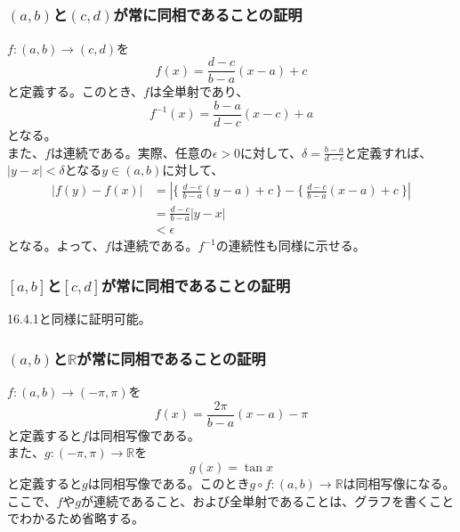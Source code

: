 \documentclass{jsarticle}
\begin{document}
\subsection{}
\subsubsection{$(a,b)$と$(c,d)$が常に同相であることの証明}
$f:(a,b)\to(c,d)$を\[f(x)=\frac{d-c}{b-a}(x-a)+c\]と定義する。このとき、$f$は全単射であり、
\[f^{-1}(x)=\frac{b-a}{d-c}(x-c)+a\]となる。\\
また、$f$は連続である。実際、任意の$\epsilon>0$に対して、$\delta=\frac{b-a}{d-c}$と定義すれば、$|y-x|<\delta$となる$y\in(a,b)$に対して、
\begin{align*}
|f(y)-f(x)|&=|\{\ \frac{d-c}{b-a}(y-a)+c\ \}-\{\ \frac{d-c}{b-a}(x-a)+c\ \}|\\
&=\frac{d-c}{b-a}|y-x|\\
&<\epsilon
\end{align*}
となる。よって、$f$は連続である。$f^{-1}$の連続性も同様に示せる。

\subsubsection{$[a,b]$と$[c,d]$が常に同相であることの証明}
16.4.1と同様に証明可能。

\subsubsection{$(a,b)$と$\mathbb{R}$が常に同相であることの証明}
$f:(a,b)\to(-\pi,\pi)$を
\[f(x)=\frac{2\pi}{b-a}(x-a)-\pi\]
と定義すると$f$は同相写像である。\\
また、$g:(-\pi,\pi)\to\mathbb{R}$を
\[g(x)=\tan x\]
と定義すると$g$は同相写像である。このとき$g\circ f:(a,b)\to\mathbb{R}$は同相写像になる。
ここで、$f$や$g$が連続であること、および全単射であることは、グラフを書くことでわかるため省略する。


\end{document}
